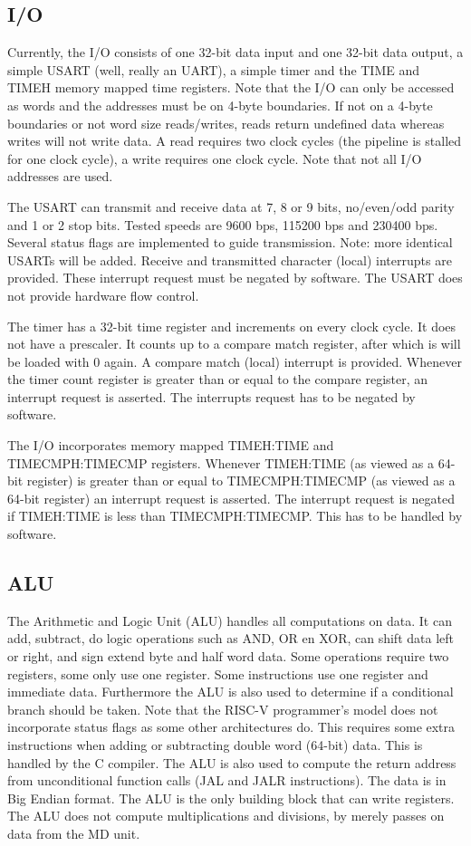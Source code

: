 \documentclass[12pt]{article}
\begin{document}
\subsection{I/O}
\label{sec/io}
Currently, the I/O consists of one 32-bit data input and one 32-bit data output, a simple USART (well, really an UART), a simple timer and the TIME and TIMEH memory mapped time registers. Note that the I/O can only be accessed as words and the addresses must be on 4-byte boundaries. If not on a 4-byte boundaries or not word size reads/writes, reads return undefined data whereas writes will not write data. A read requires two clock cycles (the pipeline is stalled for one clock cycle), a write requires one clock cycle. Note that not all I/O addresses are used.

The USART can transmit and receive data at 7, 8 or 9 bits, no/even/odd parity and 1 or 2 stop bits. Tested speeds are 9600 bps, 115200 bps and 230400 bps. Several status flags are implemented to guide transmission. Note: more identical USARTs will be added. Receive and transmitted character (local) interrupts are provided. These interrupt request must be negated by software. The USART does not provide hardware flow control.

The timer has a 32-bit time register and increments on every clock cycle. It does not have a prescaler. It counts up to a compare match register, after which is will be loaded with 0 again. A compare match (local) interrupt is provided. Whenever the timer count register is greater than or equal to the compare register, an interrupt request is asserted. The interrupts request has to be negated by software.

The I/O incorporates memory mapped TIMEH:TIME and TIMECMPH:TIMECMP registers. Whenever TIMEH:TIME (as viewed as a 64-bit register) is greater than or equal to TIMECMPH:TIMECMP (as viewed as a 64-bit register) an interrupt request is asserted. The interrupt request is negated if TIMEH:TIME is less than TIMECMPH:TIMECMP. This has to be handled by software.

\subsection{ALU}
\label{sec:alu}
The Arithmetic and Logic Unit (ALU) handles all computations on data. It can add, subtract, do logic operations such as AND, OR en XOR, can shift data left or right, and sign extend byte and half word data. Some operations require two registers, some only use one register. Some instructions use one register and immediate data. Furthermore the ALU is also used to determine if a conditional branch should be taken. Note that the RISC-V programmer's model does not incorporate status flags as some other architectures do. This requires some extra instructions when adding or subtracting double word (64-bit) data. This is handled by the C compiler. The ALU is also used to compute the return address from unconditional function calls (JAL and JALR instructions). The data is in Big Endian format. The ALU is the only building block that can write registers. The ALU does not compute multiplications and divisions, by merely passes on data from the MD unit.
\end{document}
